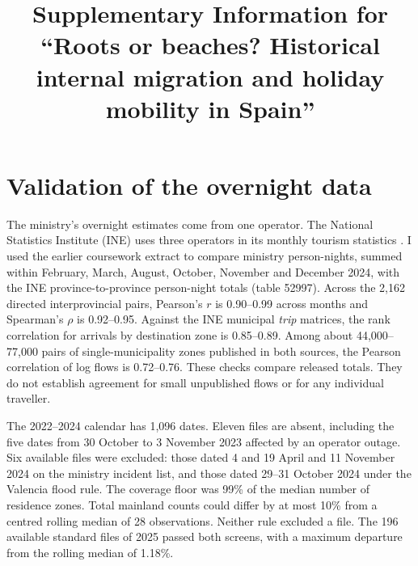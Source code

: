 \documentclass[pdflatex,sn-mathphys-num]{sn-jnl}
\begin{document}
\title[Roots or beaches? Supplementary Information]{Supplementary Information for ``Roots or beaches? Historical internal migration and holiday mobility in Spain''}
\author{ }
\maketitle

\section{Validation of the overnight data}\label{si:validation}

The ministry's overnight estimates come from one operator. The National Statistics Institute (INE) uses three operators in its monthly tourism statistics \cite{ine2026table52997,ine2026turismomoviles,gonzalezolmos2024measuring}. I used the earlier coursework extract to compare ministry person-nights, summed within February, March, August, October, November and December 2024, with the INE province-to-province person-night totals (table 52997). Across the 2,162 directed interprovincial pairs, Pearson's $r$ is 0.90--0.99 across months and Spearman's $\rho$ is 0.92--0.95. Against the INE municipal \emph{trip} matrices, the rank correlation for arrivals by destination zone is 0.85--0.89. Among about 44,000--77,000 pairs of single-municipality zones published in both sources, the Pearson correlation of log flows is 0.72--0.76. These checks compare released totals. They do not establish agreement for small unpublished flows or for any individual traveller.

The 2022--2024 calendar has 1,096 dates. Eleven files are absent, including the five dates from 30 October to 3 November 2023 affected by an operator outage. Six available files were excluded: those dated 4 and 19 April and 11 November 2024 on the ministry incident list, and those dated 29--31 October 2024 under the Valencia flood rule. The coverage floor was 99\% of the median number of residence zones. Total mainland counts could differ by at most 10\% from a centred rolling median of 28 observations. Neither rule excluded a file. The 196 available standard files of 2025 passed both screens, with a maximum departure from the rolling median of 1.18\%.
\end{document}
